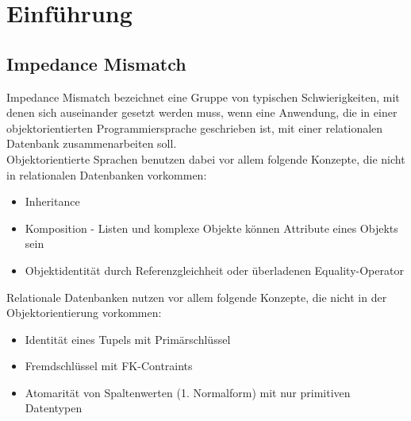 \section{Einführung}

\subsection{Impedance Mismatch}
Impedance Mismatch bezeichnet eine Gruppe von typischen Schwierigkeiten, mit denen sich auseinander gesetzt werden muss, wenn eine Anwendung, die in einer objektorientierten Programmiersprache geschrieben ist, mit einer relationalen Datenbank zusammenarbeiten soll.\\
Objektorientierte Sprachen benutzen dabei vor allem folgende Konzepte, die nicht in relationalen Datenbanken vorkommen:
\begin{itemize}
    \item Inheritance
    \item Komposition - Listen und komplexe Objekte können Attribute eines Objekts sein
    \item Objektidentität durch Referenzgleichheit oder überladenen Equality-Operator
\end{itemize}

Relationale Datenbanken nutzen vor allem folgende Konzepte, die nicht in der Objektorientierung vorkommen:
\begin{itemize}
    \item Identität eines Tupels mit Primärschlüssel
    \item Fremdschlüssel mit FK-Contraints
    \item Atomarität von Spaltenwerten (1. Normalform) mit nur primitiven Datentypen
\end{itemize}

